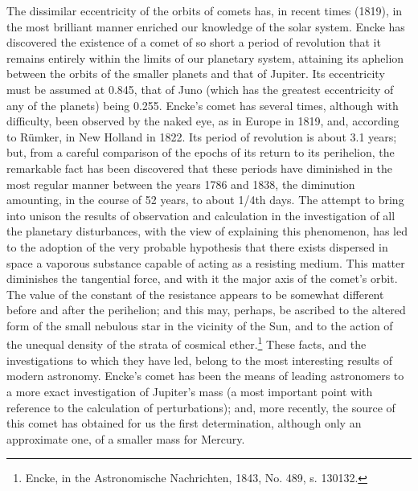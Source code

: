 The dissimilar eccentricity of the orbits of comets has, in recent times (1819), in the most brilliant manner enriched our knowledge of the solar system. Encke has discovered the existence of a comet of so short a period of revolution that it remains entirely within the limits of our planetary system, attaining its aphelion between the orbits of the smaller planets and that of Jupiter. Its eccentricity must be assumed at 0.845, that of Juno (which has the greatest eccentricity of any of the planets) being 0.255. Encke's comet has several times, although with difficulty, been observed by the naked eye, as in Europe in 1819, and, according to Rümker, in New Holland in 1822. Its period of revolution is about 3.1 years; but, from a careful comparison of the epochs of its return to its perihelion, the remarkable fact has been discovered that these periods have diminished in the most regular manner between the years 1786 and 1838, the diminution amounting, in the course of 52 years, to about 1/4th days. The attempt to bring into unison the results of observation and calculation in the investigation of all the planetary disturbances, with the view of explaining this phenomenon, has led to the adoption of the very probable hypothesis that there exists dispersed in space a vaporous substance capable of acting as a resisting medium. This matter diminishes the tangential force, and with it the major axis of the comet's orbit. The value of the constant of the resistance appears to be somewhat different before and after the perihelion; and this may, perhaps, be ascribed to the altered form of the small nebulous star in the vicinity of the Sun, and to the action of the unequal density of the strata of cosmical ether.\footnote{Encke, in the Astronomische Nachrichten, 1843, No. 489, s. 130132.} These facts, and the investigations to which they have led, belong to the most interesting results of modern astronomy. Encke's comet has been the means of leading astronomers to a more exact investigation of Jupiter's mass (a most important point with reference to the calculation of perturbations); and, more recently, the source of this comet has obtained for us the first determination, although only an approximate one, of a smaller mass for Mercury. 

